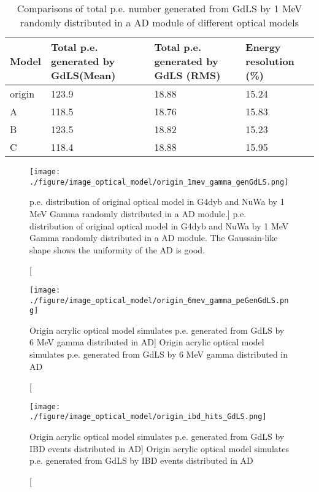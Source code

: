 \begin{table}
\centering
\caption{Comparisons of total p.e. number generated from GdLS by 1 MeV randomly distributed in a AD module of different optical models}
\label{tab:peGenGdLSOpModel}
\begin{tabular}{lp{3.0cm}p{3.0cm}p{3.0cm}}
Model  &  Total p.e. generated by GdLS(Mean)  &    Total p.e. generated by GdLS (RMS) &     Energy resolution (\%) \\
\hline
\hline
origin  & 123.9 & 18.88 & 15.24 \\
A       & 118.5 & 18.76 & 15.83 \\
B       & 123.5 & 18.82 & 15.23 \\
C       & 118.4 & 18.88 & 15.95 \\
\hline
\end{tabular}
\end{table}




\begin{figure}
    \centering
    \label{fig:origin_1mev_gamma_genGdLS.png}
    \texttt{[image: ./figure/image\_optical\_model/origin\_1mev\_gamma\_genGdLS.png]}
    \caption
[p.e. distribution of original optical model in G4dyb and NuWa by 1 MeV Gamma randomly distributed in a AD module.]
{p.e. distribution of original optical model in G4dyb and NuWa by 1 MeV Gamma randomly distributed in a AD module. The Gaussain-like shape shows the uniformity of the AD is good.}
    \end{figure}





\begin{figure}
    \centering
    \texttt{[image: ./figure/image\_optical\_model/origin\_6mev\_gamma\_peGenGdLS.png]}
    \caption
    [Origin acrylic optical model simulates p.e. generated from GdLS by 6 MeV gamma distributed in AD]
    {Origin acrylic optical model simulates p.e. generated from GdLS by 6 MeV gamma distributed in AD}
    \label{fig:origin_6mev_gamma_peGenGdLS.png}
    \end{figure}


\begin{figure}
    \centering
    \texttt{[image: ./figure/image\_optical\_model/origin\_ibd\_hits\_GdLS.png]}
    \caption
    [Origin acrylic optical model simulates p.e. generated from GdLS by IBD events distributed in AD]
    {Origin acrylic optical model simulates p.e. generated from GdLS by IBD events distributed in AD}
    \label{fig:origin_6mev_gamma_peGenGdLS.png}
    \end{figure}

